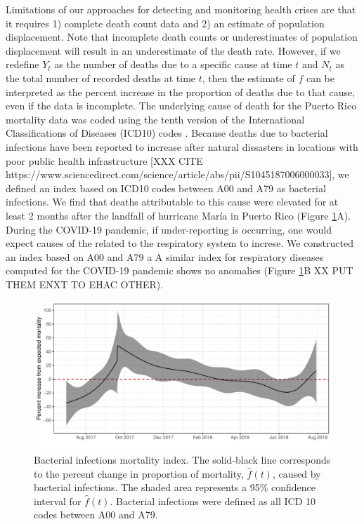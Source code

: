 \documentclass[11pt]{article}
\begin{document}
Limitations of our approaches for detecting and monitoring health crises are that it requires 1) complete death count data and 2) an estimate of population displacement. Note that incomplete death counts or underestimates of population displacement will result in an underestimate of the death rate. However, if we redefine $Y_t$ as the number of deaths due to a specific cause at time $t$ and $N_t$ as the total number of recorded deaths at time $t$, then the estimate of $f$ can be interpreted as the percent increase in the proportion of deaths due to that cause, even if the data is incomplete. The underlying cause of death for the Puerto Rico mortality data was coded using the tenth version of the International Classifications of Diseases (ICD10) codes \cite{world2004icd}. Because deaths due to bacterial infections have been reported to increase after natural dissasters in locations with poor public health infrastructure [XXX CITE https://www.sciencedirect.com/science/article/abs/pii/S1045187006000033], we defined an index based on
ICD10 codes between A00 and A79 as bacterial infections. We find that deaths attributable to this cause were elevated for at least 2 months after the landfall of hurricane Mar\'ia in Puerto Rico (Figure \ref{fig:fhat-bacteria}A). During the COVID-19 pandemic, if under-reporting is occurring, one would expect causes of the related to the respiratory system to increse. We constructed an index based on A00 and A79 a
A similar index for respiratory diseases computed for the COVID-19 pandemic shows no anomalies  (Figure \ref{fig:fhat-bacteria}B XX PUT THEM ENXT TO EHAC OTHER).

\begin{figure}[ht]
	\centering	
		\includegraphics[width=1\linewidth]{figs/figure-4.pdf} 
	\caption{Bacterial infections mortality index. The solid-black line corresponds to the percent change in proportion of mortality, $\hat{f}(t)$, caused by bacterial infections. The shaded area represents a 95\% confidence interval for $\hat{f}(t)$. Bacterial infections were defined as all ICD 10 codes between A00 and A79.}
	\label{fig:fhat-bacteria}
\end{figure}
\end{document}
